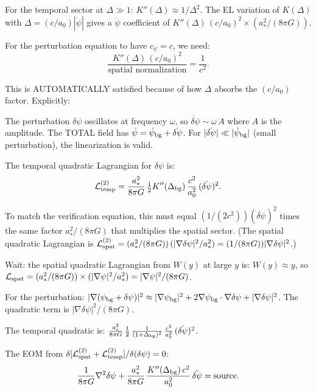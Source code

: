 \documentclass[11pt]{article}
\newcommand{\half}{\tfrac{1}{2}}
\newcommand{\dpsi}{\delta\psi}
\theoremstyle{definition}
\theoremstyle{remark}
\begin{document}
For the temporal sector at $\Delta \gg 1$: $K''(\Delta) \approx 1/\Delta^2$.
The EL variation of $K(\Delta)$ with $\Delta = (c/a_0)|\dot\psi|$ gives
a $\ddot\psi$ coefficient of $K''(\Delta)\,(c/a_0)^2 \times (a_*^2/(8\pi G))$.

For the perturbation equation to have $c_\psi = c$, we need:
\begin{equation}
\frac{K''(\Delta)\,(c/a_0)^2}{\text{spatial normalization}} = \frac{1}{c^2}.
\end{equation}

This is AUTOMATICALLY satisfied because of how $\Delta$ absorbs the
$(c/a_0)$ factor. Explicitly:

The perturbation $\dpsi$ oscillates at frequency $\omega$, so
$\dot{\dpsi} \sim \omega\,A$ where $A$ is the amplitude. The
TOTAL field has $\dot\psi = \dot\psi_{\rm bg} + \dot{\dpsi}$. For
$|\dot{\dpsi}| \ll |\dot\psi_{\rm bg}|$ (small perturbation), the
linearization is valid.

The temporal quadratic Lagrangian for $\dpsi$ is:
\begin{equation}
\mathcal{L}_{\rm temp}^{(2)} = \frac{a_*^2}{8\pi G}\,
\half K''(\Delta_{\rm bg})\,\frac{c^2}{a_0^2}\,(\dot{\dpsi})^2.
\end{equation}

To match the verification equation, this must equal $(1/(2c^2))(\dot{\dpsi})^2$
times the same factor $a_*^2/(8\pi G)$ that multiplies the spatial sector.
(The spatial quadratic Lagrangian is
$\mathcal{L}_{\rm spat}^{(2)} = (a_*^2/(8\pi G))\,(|\nabla\dpsi|^2/a_*^2)
= (1/(8\pi G))|\nabla\dpsi|^2$.)

Wait: the spatial quadratic Lagrangian from $W(y)$ at large $y$ is:
$W(y) \approx y$, so $\mathcal{L}_{\rm spat} = (a_*^2/(8\pi G)) \times
(|\nabla\psi|^2/a_*^2) = |\nabla\psi|^2/(8\pi G)$.

For the perturbation: $|\nabla(\psi_{\rm bg} + \dpsi)|^2 \approx
|\nabla\psi_{\rm bg}|^2 + 2\nabla\psi_{\rm bg}\cdot\nabla\dpsi +
|\nabla\dpsi|^2$. The quadratic term is $|\nabla\dpsi|^2/(8\pi G)$.

The temporal quadratic is:
$\frac{a_*^2}{8\pi G}\,\half\,\frac{1}{(1+\Delta_{\rm bg})^2}\,
\frac{c^2}{a_0^2}\,(\dot{\dpsi})^2$.

The EOM from $\delta[\mathcal{L}_{\rm spat}^{(2)} +
\mathcal{L}_{\rm temp}^{(2)}]/\delta(\dpsi) = 0$:
\begin{equation}
\frac{1}{8\pi G}\nabla^2\dpsi
+ \frac{a_*^2}{8\pi G}\,\frac{K''(\Delta_{\rm bg})\,c^2}{a_0^2}\,
\ddot{\dpsi} = \text{source}.
\end{equation}
\end{document}
